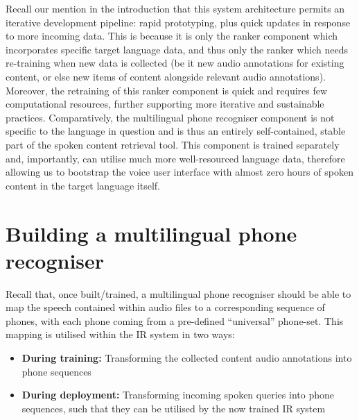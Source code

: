 \documentclass[10pt,twoside,openright]{report}
\begin{document}
Recall our mention in the introduction that this system architecture permits an iterative development pipeline: rapid prototyping, plus quick updates in response to more incoming data.
This is because it is only the ranker component which incorporates specific target language data, and thus only the ranker which needs re-training when new data is collected (be it new audio annotations for existing content, or else new items of content alongside relevant audio annotations).
Moreover, the retraining of this ranker component is quick and requires few computational resources, further supporting more iterative and sustainable practices.
Comparatively, the multilingual phone recogniser component is not specific to the language in question and is thus an entirely self-contained, stable part of the spoken content retrieval tool.
This component is trained separately and, importantly, can utilise much more well-resourced language data, therefore allowing us to bootstrap the voice user interface with almost zero hours of spoken content in the target language itself. 


\section{Building a multilingual phone recogniser}
Recall that, once built/trained, a multilingual phone recogniser should be able to map the speech contained within audio files to a corresponding sequence of phones, with each phone coming from a pre-defined ``universal'' phone-set.
This mapping is utilised within the IR system in two ways: 
\begin{itemize}
    \item \textbf{During training:} Transforming the collected content audio annotations into phone sequences
    \item \textbf{During deployment:} Transforming incoming spoken queries into phone sequences, such that they can be utilised by the now trained IR system
\end{itemize}
\end{document}
